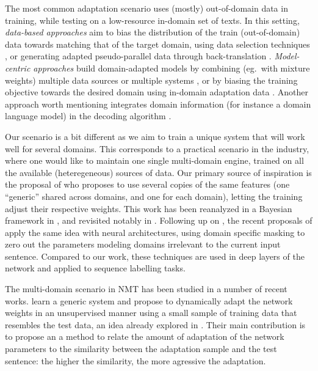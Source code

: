 \documentclass[a4paper]{article}
\begin{document}
The most common adaptation scenario uses (mostly) out-of-domain data in training, while testing on a low-resource in-domain set of texts. In this setting, \emph{data-based approaches} aim to bias the distribution of the train (out-of-domain) data towards matching that of the target domain, using data selection techniques \cite{Moore10selection,Axelrod11domain,Duh13selection}, or generating adapted pseudo-parallel data through back-translation  \cite{Utiyama03measure,Wang14neural,Wang16connecting,Sennrich16improving}. \emph{Model-centric approaches} build domain-adapted models by combining (eg.\ with mixture weights) multiple data sources or multiple systems \cite{Foster07mixture,Wang17instance}, or by biasing the training objective towards the desired domain using in-domain adaptation data \cite{Luong15stanford,Freitag16fast,Chen17costweighting}. Another approach worth mentioning integrates domain information (for instance a domain language model) in the decoding algorithm \cite{Gulcehre17onintegrating}.

Our scenario is a bit different as we aim to train a unique system that will work well for several domains. This corresponds to a practical scenario in the industry, where one would like to maintain one single multi-domain engine, trained on all the available (heteregeneous) sources of data. Our primary source of inspiration is the proposal of \cite{Daume07frustratingly} who proposes to use several copies of the same features (one ``generic'' shared across domains, and one for each domain), letting the training adjust their respective weights. This work has been reanalyzed in a Bayesian framework in \cite{Finkel09hierarchical}, and revisited notably in \cite{Chang10necessity}. Following up on \cite{Yang15unified}, the recent proposals of \cite{Peng17multitask} apply the same idea with neural architectures, using domain specific masking to zero out the parameters modeling domains irrelevant to the current input sentence. Compared to our work, these techniques are used in deep layers of the network and applied to sequence labelling tasks.

The multi-domain scenario in NMT has been studied in a number of recent works. \cite{Farajian17multidomain} learn a generic system and propose to dynamically adapt the network weights in an unsupervised manner using a small sample of training data that resembles the test data, an idea already explored in \cite{Sennrich13multidomain}. Their main contribution is to propose an a method to relate the amount of adaptation of the network parameters to the similarity between the adaptation sample and the test sentence: the higher the similarity, the more agressive the adaptation.
\end{document}

